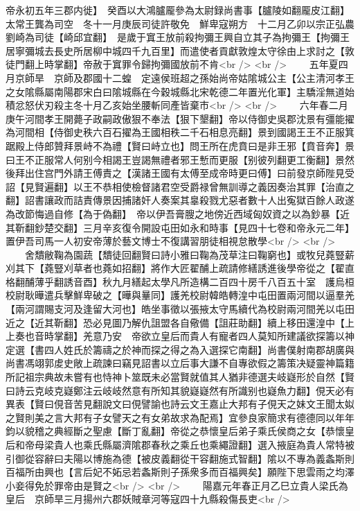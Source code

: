 帝永初五年三郡内徙】　癸酉以大鴻臚龎參為太尉録尚書事【臚陵如翻龎皮江翻】太常王龔為司空　冬十一月庚辰司徒許敬免　鮮卑寇朔方　十二月乙卯以宗正弘農劉崎為司徒【崎邱宜翻】　是歲于窴王放前殺拘彌王興自立其子為拘彌王【拘彌王居寧彌城去長史所居柳中城四千九百里】而遣使者貢獻敦煌太守徐由上求討之【敦徒門翻上時掌翻】帝赦于窴罪令歸拘彌國放前不肯<br />
<br />
　　五年夏四月京師旱　京師及郡國十二蝗　定遠侯班超之孫始尚帝姑隂城公主【公主清河孝王之女隂縣屬南陽郡宋白曰隂城縣在今穀城縣北宋乾德二年置光化軍】主驕淫無道始積忿怒伏刃殺主冬十月乙亥始坐腰斬同產皆棄市<br />
<br />
　　六年春二月庚午河間孝王開薨子政嗣政傲狠不奉法【狠下墾翻】帝以侍御史吳郡沈景有彊能擢為河間相【侍御史秩六百石擢為王國相秩二千石相息亮翻】景到國謁王王不正服箕踞殿上侍郎贊拜景峙不為禮【賢曰峙立也】問王所在虎賁曰是非王邪【賁音奔】景曰王不正服常人何别今相謁王豈謁無禮者邪王慙而更服【别彼列翻更工衡翻】景然後拜出住宫門外請王傅責之【漢諸王國有太傅至成帝時更曰傅】曰前發京師陛見受詔【見賢遍翻】以王不恭相使檢督諸君空受爵禄曾無訓導之義因奏治其罪【治直之翻】詔書讓政而詰責傳景因捕諸奸人奏案其辠殺戮尤惡者數十人出寃獄百餘人政遂為改節悔過自修【為于偽翻】　帝以伊吾膏膄之地傍近西域匈奴資之以為鈔暴【近其靳翻鈔楚交翻】三月辛亥復令開設屯田如永和時事【見四十七卷和帝永元二年】置伊吾司馬一人初安帝薄於藝文博士不復講習朋徒相視怠散學<br />
<br />
　　舍穨敝鞠為園蔬【穨徒回翻賢曰詩小雅曰鞠為茂草注曰鞠窮也】或牧兒蕘豎薪刈其下【蕘豎刈草者也蕘如招翻】將作大匠翟酺上疏請修繕誘進後學帝從之【翟直格翻酺薄乎翻誘音酉】秋九月繕起太學凡所造構二百四十房千八百五十室　護烏桓校尉耿曄遣兵擊鮮卑破之【曄與曅同】護羌校尉韓皓轉湟中屯田置兩河間以逼羣羌【兩河謂賜支河及逢留大河也】皓坐事徵以張掖太守馬續代為校尉兩河間羌以屯田近之【近其靳翻】恐必見圖乃解仇詛盟各自儆備【詛莊助翻】續上移田還湟中【上上奏也音時掌翻】羌意乃安　帝欲立皇后而貴人有寵者四人莫知所建議欲探籌以神定選【書四人姓氏於籌禱之於神而探之得之為入選探它南翻】尚書僕射南郡胡廣與尚書馮翊郭䖍史敞上疏諫曰竊見詔書以立后事大謙不自專欲假之籌策决疑靈神篇籍所記祖宗典故未嘗有也恃神卜筮既未必當賢就值其人猶非德選夫岐嶷形於自然【賢曰詩云克岐克嶷鄭注云岐岐然意有所知其貌嶷嶷然有所識别也嶷魚力翻】俔天必有異表【賢曰俔音苦見翻說文曰俔譬諭也詩云文王嘉止大邦有子俔天之妹文王聞太姒之賢則美之言大邦有子女譬天之有女弟故求為配焉】宜參良家簡求有德德同以年年鈞以貌稽之典經斷之聖慮【斷丁亂翻】帝從之恭懷皇后弟子乘氏侯商之女【恭懷皇后和帝母梁貴人也乘氏縣屬濟隂郡春秋之乘丘也乘繩證翻】選入掖庭為貴人常特被引御從容辭曰夫陽以博施為德【被皮義翻從干容翻施式智翻】隂以不專為義螽斯則百福所由興也【言后妃不妬忌若螽斯則子孫衆多而百福興矣】願陛下思雲雨之均澤小妾得免於罪帝由是賢之<br />
<br />
　　陽嘉元年春正月乙巳立貴人梁氏為皇后　京師旱三月揚州六郡妖賊章河等寇四十九縣殺傷長吏<br />
